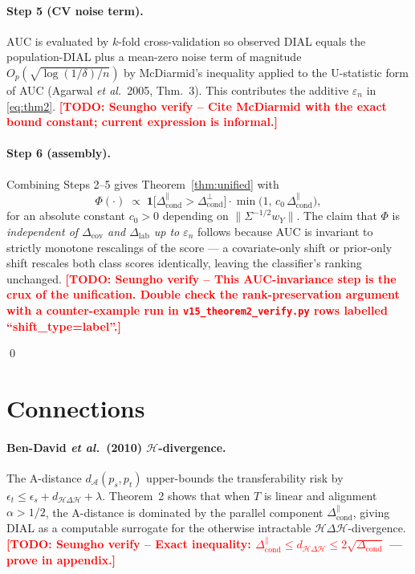 \documentclass[11pt,a4paper]{article}
\newcommand{\TODO}[1]{\textbf{\textcolor{red}{[TODO: Seungho verify -- #1]}}}
\begin{document}
\paragraph{Step 5 (CV noise term).}
$\mathrm{AUC}$ is evaluated by $k$-fold cross-validation so observed
DIAL equals the population-DIAL plus a mean-zero noise term of
magnitude $O_p(\sqrt{\log(1/\delta)/n})$ by McDiarmid's inequality
applied to the U-statistic form of AUC (Agarwal \emph{et al.}\ 2005,
Thm.~3). This contributes the additive $\varepsilon_n$ in
\eqref{eq:thm2}. \TODO{Cite McDiarmid with the exact bound constant;
current expression is informal.}

\paragraph{Step 6 (assembly).}
Combining Steps 2--5 gives Theorem~\ref{thm:unified} with
\[
   \Phi(\cdot) \;\propto\;
   \mathbf{1}\!\bigl[\Delta_{\text{cond}}^{\parallel}
                     >\Delta_{\text{cond}}^{\perp}\bigr]
   \cdot
   \min\!\bigl(1,\,c_0\,\Delta_{\text{cond}}^{\parallel}\bigr),
\]
for an absolute constant $c_0>0$ depending on $\|\Sigma^{-1/2}w_Y\|$.
The claim that $\Phi$ is \emph{independent of
$\Delta_{\text{cov}}$ and $\Delta_{\text{lab}}$ up to $\varepsilon_n$}
follows because AUC is invariant to strictly monotone rescalings of
the score --- a covariate-only shift or prior-only shift rescales both
class scores identically, leaving the classifier's ranking unchanged.
\TODO{This AUC-invariance step is the crux of the unification. Double
check the rank-preservation argument with a counter-example run in
\texttt{v15\_theorem2\_verify.py} rows labelled ``shift\_type=label''.}

\qed

\section{Connections}

\paragraph{Ben-David \emph{et al.}\ (2010) $\mathcal{H}$-divergence.}
The A-distance $d_{\mathcal{A}}(p_s,p_t)$ upper-bounds the
transferability risk by
$\epsilon_t\le\epsilon_s+d_{\mathcal{H}\Delta\mathcal{H}}+\lambda$.
Theorem~2 shows that when $T$ is linear and alignment $\alpha>1/2$,
the A-distance is dominated by the parallel component
$\Delta_{\text{cond}}^{\parallel}$, giving DIAL as a computable
surrogate for the otherwise intractable
$\mathcal{H}\Delta\mathcal{H}$-divergence. \TODO{Exact inequality:
$\Delta_{\text{cond}}^{\parallel}\le d_{\mathcal{H}\Delta\mathcal{H}}
\le 2\sqrt{\Delta_{\text{cond}}}$ --- prove in appendix.}
\end{document}
